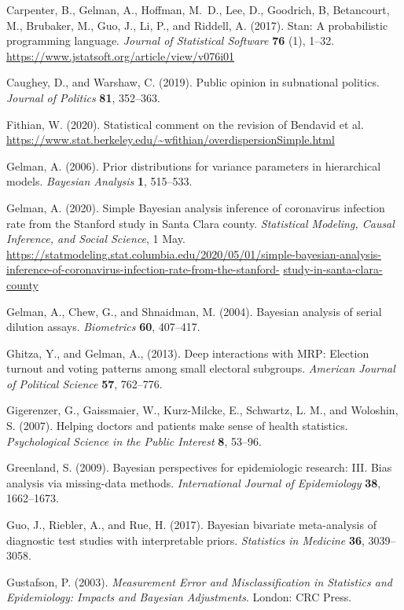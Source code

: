 \documentclass[11pt]{article}
\begin{document}
\bibitem Carpenter, B., Gelman, A., Hoffman, M.~D., Lee, D., Goodrich, B, Betancourt, M., Brubaker, M., Guo, J.,  Li, P., and Riddell, A.  (2017). Stan: A probabilistic programming language. {\em Journal of Statistical Software} {\bf 76} (1), 1--32. {\small \url{https://www.jstatsoft.org/article/view/v076i01}}

\bibitem Caughey, D., and Warshaw, C. (2019).  Public opinion in subnational politics.  {\em Journal of Politics} {\bf 81}, 352--363.

\bibitem Fithian, W. (2020).  Statistical comment on the revision of Bendavid et al. {\small \url{https://www.stat.berkeley.edu/~wfithian/overdispersionSimple.html}}

\bibitem Gelman, A. (2006). Prior distributions for variance parameters in hierarchical models. {\em Bayesian Analysis} {\bf 1}, 515--533.
  
\bibitem Gelman, A. (2020).  Simple Bayesian analysis inference of coronavirus infection rate from the Stanford study in Santa Clara county. {\em Statistical Modeling, Causal Inference, and Social Science}, 1 May.  {\small \url{https://statmodeling.stat.columbia.edu/2020/05/01/simple-bayesian-analysis-inference-of-coronavirus-infection-rate-from-the-stanford-}} {\small \url{study-in-santa-clara-county}}

  
\bibitem Gelman, A., Chew, G., and Shnaidman, M. (2004).  Bayesian analysis of serial dilution assays. {\em Biometrics} {\bf 60}, 407--417.

\bibitem Ghitza, Y., and Gelman, A., (2013). Deep interactions with MRP: Election turnout and voting patterns among small electoral subgroups. {\em American Journal of Political Science} {\bf 57}, 762--776.

\bibitem Gigerenzer, G., Gaissmaier, W., Kurz-Milcke, E., Schwartz, L. M., and Woloshin, S.  (2007).  Helping doctors and patients make sense of health statistics.  {\em Psychological Science in the Public Interest} {\bf 8}, 53--96.

\bibitem Greenland, S. (2009).  Bayesian perspectives for epidemiologic research: III. Bias analysis via missing-data methods.  {\em International Journal of Epidemiology} {\bf 38}, 1662--1673.

\bibitem Guo, J., Riebler, A., and Rue, H. (2017).  Bayesian bivariate meta-analysis of diagnostic test studies with interpretable priors.  {\em Statistics in Medicine} {\bf 36}, 3039--3058.

\bibitem Gustafson, P. (2003).  {\em Measurement Error and Misclassification in Statistics and Epidemiology: Impacts and Bayesian Adjustments}.  London:  CRC Press.
\end{document}
